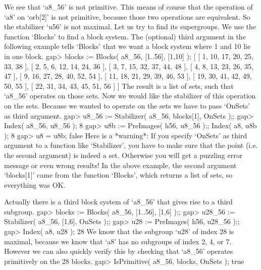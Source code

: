 We see that `a8_56'   is not primitive. This  means  of course   that the
operation  of `a8'  on  `orb[2]'  is not  primitive,  because those   two
operations are equivalent. So the stabilizer `u56' is not maximal. Let us
try to find its supergroups. We use the function `Blocks' to find a block
system. The  (optional) third  argument  in the following   example tells
`Blocks' that we want a block system where 1 and 10 lie in one block.
\beginexample
    gap> blocks := Blocks( a8_56, [1..56], [1,10] );
    [ [ 1, 10, 17, 20, 25, 33, 38 ], [ 2, 5, 6, 12, 14, 24, 36 ], 
      [ 3, 7, 15, 32, 37, 44, 48 ], [ 4, 8, 13, 23, 26, 35, 47 ], 
      [ 9, 16, 27, 28, 40, 52, 54 ], [ 11, 18, 21, 29, 39, 46, 53 ], 
      [ 19, 30, 41, 42, 49, 50, 55 ], [ 22, 31, 34, 43, 45, 51, 56 ] ]
\endexample
The result is a list  of sets, such that  `a8_56' operates on those sets.
Now we would like  the stabilizer of this  operation on the sets. Because
we  wanted to operate on   the sets we  have  to  pass `OnSets' as  third
argument.
\beginexample
    gap> u8_56 := Stabilizer( a8_56, blocks[1], OnSets );;
    gap> Index( a8_56, u8_56 );
    8
    gap> u8b := PreImages( h56, u8_56 );; Index( a8, u8b );
    8
    gap> u8 = u8b;
    false
\endexample
Here  is a *warning*:   If you specify `OnSets'  as  third argument  to a
function like  `Stabilizer', you have to  make sure that the  point (i.e.
the second argument) is  indeed a set. Otherwise you  will get a puzzling
error message or  even  wrong results! In  the above  example, the second
argument  `blocks[1]'  came from the  function  `Blocks', which returns a
list of sets, so everything was OK.

Actually there  is a third  block system of `a8_56'  that gives rise to a
third subgroup.
\beginexample
    gap> blocks := Blocks( a8_56, [1..56], [1,6] );;
    gap> u28_56 := Stabilizer( a8_56, [1,6], OnSets );;
    gap> u28 := PreImages( h56, u28_56 );;
    gap> Index( a8, u28 );
    28 
\endexample
We know that  the subgroup `u28' of index  28 is maximal, because we know
that  `a8' has no  subgroups  of index 2,  4,  or 7.  However we can also
quickly verify this by checking  that `a8_56' operates primitively on the
28 blocks.
\beginexample
    gap> IsPrimitive( a8_56, blocks, OnSets );
    true 
\endexample


